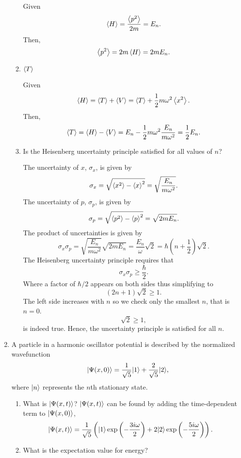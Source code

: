 \documentclass[a4paper, 12pt]{config/homework}
\begin{document}
\begin{enumerate}
\begin{enumerate}[label=(\alph*)]
Given \[\expval{H} = \frac{\expval{p^2}}{2m} = E_n.\]
Then, \[\expval{p^2} = 2m\expval{H} = 2m E_n.\]

\item \(\expval{T}\)

Given
\[\expval{H} = \expval{T} + \expval{V} = \expval{T} + \frac{1}{2}m\omega^2\expval{x^2}.\]
Then,
\[\expval{T} = \expval{H} - \expval{V} = E_n - \frac{1}{2}m\omega^2\frac{E_n}{m\omega^2} = \frac{1}{2}E_n.\]

\item Is the Heisenberg uncertainty principle satisfied for all values of \(n\)?

The uncertainty of \(x\), \(\sigma_x\), is given by
\[\sigma_x = \sqrt{\expval{x^2} - \expval{x}^2} = \sqrt{\frac{E_n}{m\omega^2}}.\]
The uncertainty of \(p\), \(\sigma_p\), is given by
\[\sigma_p = \sqrt{\expval{p^2} - \expval{p}^2} = \sqrt{2mE_n}.\]
The product of uncertainties is given by
\[\sigma_x\sigma_p = \sqrt{\frac{E_n}{m\omega^2}}\sqrt{2mE_n} = \frac{E_n}{\omega}\sqrt{2} = \hbar\left(n+\frac{1}{2}\right)\sqrt{2}.\]
The Heisenberg uncertainty principle requires that
\[\sigma_x\sigma_p \ge \frac{\hbar}{2}.\]
Where a factor of \(\hbar/2\) appears on both sides thus simplifying to
\[\left(2n + 1\right)\sqrt{2} \ge 1.\]
The left side increases with \(n\) so we check only the smallest \(n\), that is \(n=0\).
\[\sqrt{2} \ge 1,\]
is indeed true. Hence, the uncertainty principle is satisfied for all \(n\).

\end{enumerate}

\pagebreak
\item A particle in a harmonic oscillator potential is described by the normalized wavefunction
\[\ket*{\Psi(x,0)} = \frac{1}{\sqrt{5}}\ket*{1} + \frac{2}{\sqrt{5}}\ket*{2},\]
where \(\ket*{n}\) represents the \(n\)th stationary state.
\begin{enumerate}[label=(\alph*)]
\item What is \(\ket*{\Psi(x,t)}\)?
\(\ket*{\Psi(x,t)}\) can be found by adding the time-dependent term to \(\ket*{\Psi(x,0)}\),
\begin{align*}
\ket*{\Psi(x,t)} &=
\frac{1}{\sqrt{5}} \left( \ket*{1} \exp\left({- \frac{3i\omega}{2}}\right)
+ 2\ket*{2}\exp\left({- \frac{5i\omega}{2}}\right)\right).
\end{align*}

\item What is the expectation value for energy?


\end{enumerate}
\end{enumerate}
\end{document}

